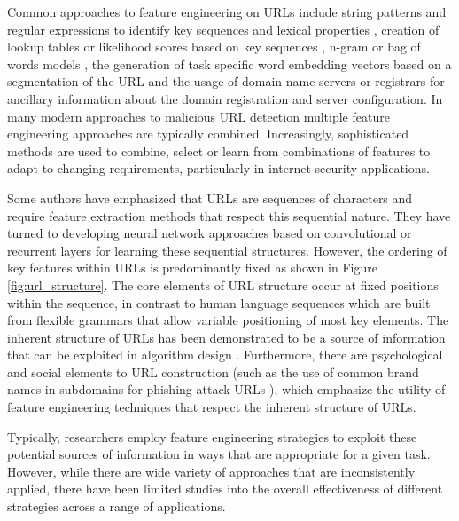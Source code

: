 \documentclass{aircc}
\begin{document}
Common approaches to feature engineering on URLs include string patterns and regular 
expressions to identify key sequences and lexical properties 
\cite{Kan2004,Garera2007,Mamun2016,Tupsamudre2019}, 
creation of lookup tables or likelihood scores based on key sequences
\cite{Meshkizadeh2010}, n-gram or bag of words models \cite{Baykan2009,Verma2017}, 
the generation of task specific word embedding vectors based on a segmentation of the 
URL \cite{Le2018,Qiu2020} and the usage of domain name servers or registrars for 
ancillary information about the domain registration 
and server configuration\cite{Canali2011,Li2020}. 
In many modern approaches to malicious URL detection
multiple feature engineering approaches are typically combined\cite{Sayamber2014,Li2020}.
Increasingly, sophisticated methods are used to combine, select or learn from 
combinations of features to adapt to changing requirements, particularly in 
internet security applications\cite{Sountharrajan2020,Li2020}.

Some authors have emphasized that URLs are sequences of characters and require 
feature extraction methods that respect 
this sequential nature\cite{Le2018,Vazhayil2018}. 
They have turned to developing neural network approaches
based on convolutional or recurrent layers for learning these sequential structures.
However, the ordering of key features within URLs is predominantly fixed as shown 
in Figure \ref{fig:url_structure}. The core elements of URL structure occur at 
fixed positions within the sequence, in contrast to human language
sequences which are built from flexible grammars that allow variable positioning of 
most key elements. The inherent structure of URLs has been demonstrated to be a source 
of information that can be exploited in algorithm design \cite{Shih2004}. Furthermore,
there are psychological and social elements to URL construction (such as the use of 
common brand names in subdomains for phishing attack URLs \cite{Tupsamudre2019}), 
which emphasize the utility of feature engineering techniques that
respect the inherent structure of URLs.

Typically, researchers employ feature engineering strategies to exploit these 
potential sources of information
in ways that are appropriate for a given task. However, while there are wide variety
of approaches that are inconsistently applied, there have been limited studies into
the overall effectiveness of different strategies across a range of applications.
\end{document}
